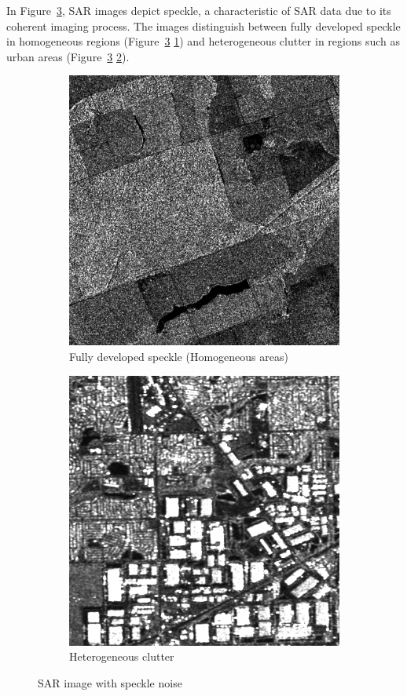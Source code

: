 In Figure~\ref{fig:speckle}, SAR images depict speckle, a characteristic of SAR data due to its coherent imaging process. 
The images distinguish between fully developed speckle in homogeneous regions (Figure~\ref{fig:speckle} \ref{fig:s1}) and heterogeneous clutter in regions such as urban areas (Figure~\ref{fig:speckle} \ref{fig:s2}).
\begin{figure}[H]
  \centering
  \begin{subfigure}[b]{0.48\textwidth}
    \centering
    \includegraphics[width=.8\textwidth]{../../Images/PNG/Intensity_MG.png}
    \caption{Fully developed speckle (Homogeneous areas)}
    \label{fig:s1}
  \end{subfigure}
  \hfill
  \begin{subfigure}[b]{0.45\textwidth}
    \centering
    \includegraphics[width=.85\textwidth]{../../Images/PNG/urban_intensity.png}
    \caption{Heterogeneous clutter }
    \label{fig:s2}
  \end{subfigure}
  \caption{SAR image with speckle noise}
  \label{fig:speckle}
\end{figure}

